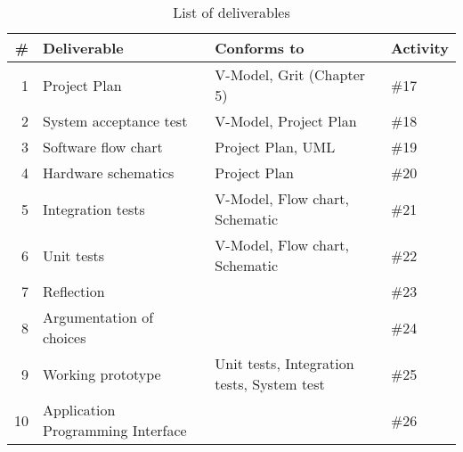 \begin{table}
\centering
\begin{adjustwidth}{-1in}{1in}
\centering
\caption{List of deliverables \label{tbl:deliverables}}
\begin{tabular}{rlll}
\# & Deliverable & Conforms to & Activity  \\
\hline
1 & Project Plan & V-Model\cite{vmodel}, Grit (Chapter 5)\cite{grit}  & \#17 \\
2 & System acceptance test & V-Model\cite{vmodel}, Project Plan  & \#18 \\
3 & Software flow chart & Project Plan, UML\cite{uml}  & \#19 \\
4 & Hardware schematics & Project Plan  & \#20 \\
5 & Integration tests & V-Model\cite{vmodel}, Flow chart, Schematic  & \#21 \\
6 & Unit tests & V-Model\cite{vmodel}, Flow chart, Schematic  & \#22 \\
7 & Reflection  && \#23 \\
8 & Argumentation of choices  && \#24 \\
9 & Working prototype & Unit tests, Integration tests, System test  & \#25 \\
10 & Application Programming Interface  && \#26 \\
\end{tabular}
\end{adjustwidth}
\end{table}

